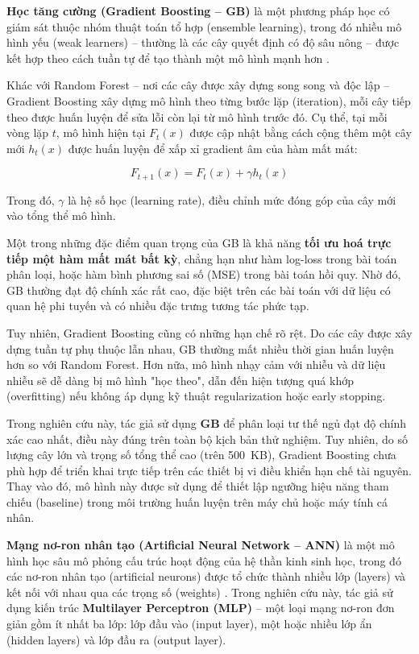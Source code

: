 \textbf{Học tăng cường (Gradient Boosting – GB)} là một phương pháp học 
có giám sát thuộc nhóm thuật toán tổ hợp (ensemble learning), 
trong đó nhiều mô hình yếu (weak learners) – thường là các cây quyết định có độ sâu nông – 
được kết hợp theo cách tuần tự để tạo thành một mô hình mạnh hơn \cite{chen2016xgboost}.

Khác với Random Forest – nơi các cây được xây dựng song song và độc lập 
– Gradient Boosting xây dựng mô hình theo từng bước lặp (iteration), 
mỗi cây tiếp theo được huấn luyện để sửa lỗi còn lại từ mô hình trước đó. 
Cụ thể, tại mỗi vòng lặp $t$, mô hình hiện tại $F_t(x)$ được cập nhật 
bằng cách cộng thêm một cây mới $h_t(x)$ được huấn luyện để xấp xỉ 
gradient âm của hàm mất mát:

\begin{equation}
F_{t+1}(x) = F_t(x) + \gamma h_t(x)
\end{equation}

Trong đó, $\gamma$ là hệ số học (learning rate), điều chỉnh mức đóng góp của cây mới vào tổng thể mô hình.

Một trong những đặc điểm quan trọng của GB là khả năng 
\textbf{tối ưu hoá trực tiếp một hàm mất mát bất kỳ}, 
chẳng hạn như hàm log-loss trong bài toán phân loại, hoặc hàm bình 
phương sai số (MSE) trong bài toán hồi quy. Nhờ đó, GB thường đạt độ 
chính xác rất cao, đặc biệt trên các bài toán với dữ liệu có quan 
hệ phi tuyến và có nhiều đặc trưng tương tác phức tạp.

Tuy nhiên, Gradient Boosting cũng có những hạn chế rõ rệt. 
Do các cây được xây dựng tuần tự phụ thuộc lẫn nhau, 
GB thường mất nhiều thời gian huấn luyện hơn so với Random Forest. 
Hơn nữa, mô hình nhạy cảm với nhiễu và dữ liệu nhiễu sẽ dễ dàng 
bị mô hình "học theo", dẫn đến hiện tượng quá khớp (overfitting) 
nếu không áp dụng kỹ thuật regularization hoặc early stopping.

Trong nghiên cứu này, tác giả sử 
dụng \textbf{GB} để phân loại tư thế ngủ đạt độ chính xác cao nhất, điều này đúng trên toàn bộ kịch bản thử nghiệm.
Tuy nhiên, do số lượng cây lớn và trọng số tổng thể cao (trên 500~KB), Gradient Boosting chưa phù hợp để triển khai 
trực tiếp trên các thiết bị vi điều khiển hạn chế tài nguyên. Thay vào đó, mô hình này được sử dụng để thiết lập ngưỡng hiệu năng tham chiếu (baseline) trong môi trường huấn luyện trên máy chủ hoặc máy tính cá nhân.


\textbf{Mạng nơ-ron nhân tạo (Artificial Neural Network – ANN)} là một 
mô hình học sâu mô phỏng cấu trúc hoạt động của hệ thần kinh sinh học, 
trong đó các nơ-ron nhân tạo (artificial neurons) được tổ chức thành nhiều 
lớp (layers) và kết nối với nhau qua các trọng số (weights) \cite{jain1996}. 
Trong nghiên cứu này, tác giả sử dụng kiến trúc \textbf{Multilayer Perceptron (MLP)} – 
một loại mạng nơ-ron đơn giản gồm ít nhất ba lớp: lớp đầu vào (input layer), 
một hoặc nhiều lớp ẩn (hidden layers) và lớp đầu ra (output layer).

